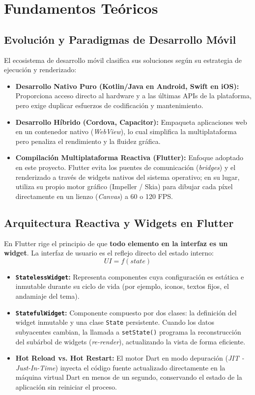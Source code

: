 \documentclass[12pt,a4paper]{article}
\begin{document}
\section{Fundamentos Teóricos}

\subsection{Evolución y Paradigmas de Desarrollo Móvil}
El ecosistema de desarrollo móvil clasifica sus soluciones según su estrategia de ejecución y renderizado:
\begin{itemize}[leftmargin=*]
    \item \textbf{Desarrollo Nativo Puro (Kotlin/Java en Android, Swift en iOS):} Proporciona acceso directo al hardware y a las últimas APIs de la plataforma, pero exige duplicar esfuerzos de codificación y mantenimiento.
    \item \textbf{Desarrollo Híbrido (Cordova, Capacitor):} Empaqueta aplicaciones web en un contenedor nativo (\textit{WebView}), lo cual simplifica la multiplataforma pero penaliza el rendimiento y la fluidez gráfica.
    \item \textbf{Compilación Multiplataforma Reactiva (Flutter):} Enfoque adoptado en este proyecto. Flutter evita los puentes de comunicación (\textit{bridges}) y el renderizado a través de widgets nativos del sistema operativo; en su lugar, utiliza su propio motor gráfico (Impeller / Skia) para dibujar cada píxel directamente en un lienzo (\textit{Canvas}) a 60 o 120 FPS.
\end{itemize}

\subsection{Arquitectura Reactiva y Widgets en Flutter}
En Flutter rige el principio de que \textbf{todo elemento en la interfaz es un widget}. La interfaz de usuario es el reflejo directo del estado interno:
\begin{equation}
    UI = f(state)
\end{equation}

\begin{itemize}[leftmargin=*]
    \item \textbf{\texttt{StatelessWidget}:} Representa componentes cuya configuración es estática e inmutable durante su ciclo de vida (por ejemplo, iconos, textos fijos, el andamiaje del tema).
    \item \textbf{\texttt{StatefulWidget}:} Componente compuesto por dos clases: la definición del widget inmutable y una clase \texttt{State} persistente. Cuando los datos subyacentes cambian, la llamada a \texttt{setState()} programa la reconstrucción del subárbol de widgets (\textit{re-render}), actualizando la vista de forma eficiente.
    \item \textbf{Hot Reload vs. Hot Restart:} El motor Dart en modo depuración (\textit{JIT - Just-In-Time}) inyecta el código fuente actualizado directamente en la máquina virtual Dart en menos de un segundo, conservando el estado de la aplicación sin reiniciar el proceso.
\end{itemize}
\end{document}
